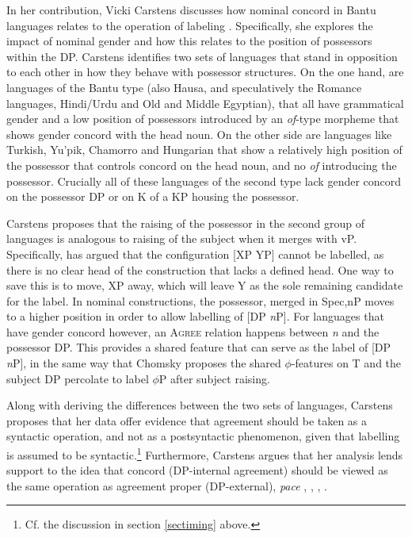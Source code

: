 \documentclass[output=paper
,modfonts
,nonflat]{langsci/langscibook}
\begin{document}
In her contribution, Vicki Carstens discusses how nominal concord in Bantu languages relates to the operation of labeling \citep{Chomsky2013,Chomsky2015}.
Specifically, she explores the impact of nominal gender and how this relates to the position of possessors within the DP.
Carstens identifies two sets of languages that stand in opposition to each other in how they behave with possessor structures.
On the one hand, are languages of the Bantu type (also Hausa, and speculatively the Romance languages, Hindi/Urdu and Old and Middle Egyptian), that all have grammatical gender and a low position of possessors introduced by an \emph{of}-type morpheme that shows gender concord with the head noun.
On the other side are languages like Turkish, Yu'pik, Chamorro and Hungarian that show a relatively high position of the possessor that controls concord on the head noun, and no \emph{of} introducing the possessor.
Crucially all of these languages of the second type lack gender concord on the possessor DP or on K of a KP housing the possessor.

Carstens proposes that the raising of the possessor in the second group of languages is analogous to raising of the subject when it merges with vP.
Specifically, \citet{Chomsky2013} has argued that the configuration [XP YP] cannot be labelled, as there is no clear head of the construction that lacks a defined head.
One way to save this is to move, XP away, which will leave Y as the sole remaining candidate for the label.
In nominal constructions, the possessor, merged in Spec,nP moves to a higher position in order to allow labelling of [DP \emph{n}P].
For languages that have gender concord however, an \textsc{Agree} relation happens between \emph{n} and the possessor DP.
This provides a shared feature that can serve as the label of [DP \emph{n}P], in the same way that Chomsky proposes the shared $\phi$-features on T and the subject DP percolate to label $\phi$P after subject raising.

Along with deriving the differences between the two sets of languages, Carstens  proposes that her data offer evidence that agreement should be taken as a syntactic operation, and not as a postsyntactic phenomenon, given that labelling is assumed to be syntactic.\footnote{
	Cf. the discussion in section \ref{sectiming} above.
}
Furthermore, Carstens argues that her analysis lends support to the idea that concord (DP-internal agreement) should be viewed as the same operation as agreement proper (DP-external), \emph{pace} \citet{Chomsky2001}, \citet{Chung2013}, \citet{Norris2014}, \citet{Baier2015}.
\end{document}
